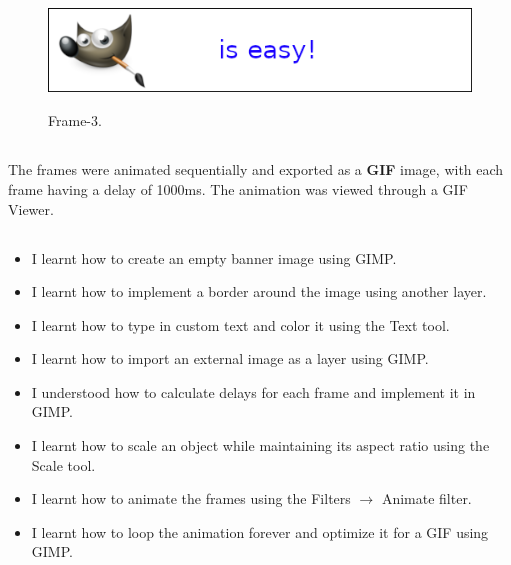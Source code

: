 \documentclass[12pt, a4]{article}
\begin{document}
\subsection*{}
\begin{figure}[h]
\centering
\caption{Frame-3.}
\includegraphics[height=3cm, width=12cm]{Frame-3.png}
\end{figure}

\newpage
\subsection*{}
\bigskip
The frames were animated sequentially and exported as a \textbf{GIF} image, with each frame having a delay of 1000ms. The animation was viewed through a GIF Viewer.



\subsection*{}
\begin{itemize}
\item I learnt how to create an empty banner image using GIMP.
\item I learnt how to implement a border around the image using another layer.
\item I learnt how to type in custom text and color it using the Text tool.
\item I learnt how to import an external image as a layer using GIMP.
\item I understood how to calculate delays for each frame and implement it in GIMP.
\item I learnt how to scale an object while maintaining its aspect ratio using the Scale tool.
\item I learnt how to animate the frames using the Filters $\rightarrow$ Animate filter.
\item I learnt how to loop the animation forever and optimize it for a GIF using GIMP.
\end{itemize}
\end{document}
